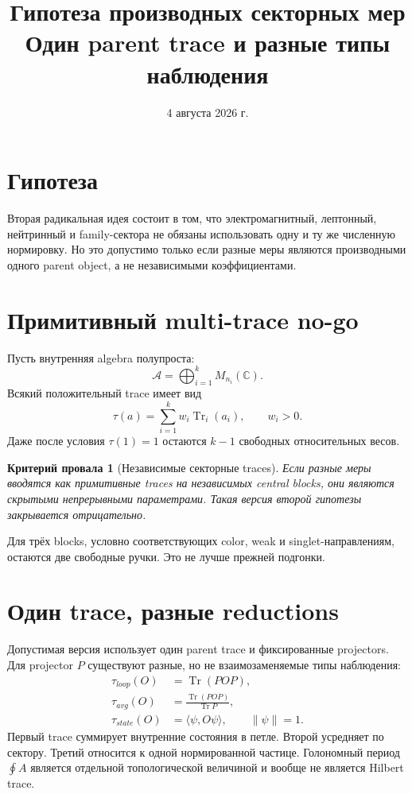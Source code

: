 \documentclass[12pt,a4paper]{article}
\title{Гипотеза производных секторных мер\\
Один parent trace и разные типы наблюдения}
\author{}
\date{4 августа 2026 г.}
\newtheorem{nogocriterion}{Критерий провала}
\begin{document}
\maketitle

\section{Гипотеза}

Вторая радикальная идея состоит в том, что электромагнитный, лептонный, нейтринный и family-сектора не обязаны использовать одну и ту же численную нормировку. Но это допустимо только если разные меры являются производными одного parent object, а не независимыми коэффициентами.

\section{Примитивный multi-trace no-go}

Пусть внутренняя algebra полупроста:
\[
\mathcal A=\bigoplus_{i=1}^k M_{n_i}(\mathbb C).
\]
Всякий положительный trace имеет вид
\[
\tau(a)=\sum_{i=1}^k w_i\operatorname{Tr}_i(a_i),
\qquad
w_i>0.
\]
Даже после условия \(\tau(1)=1\) остаются \(k-1\) свободных относительных весов.

\begin{nogocriterion}[Независимые секторные traces]
Если разные меры вводятся как примитивные traces на независимых central blocks, они являются скрытыми непрерывными параметрами. Такая версия второй гипотезы закрывается отрицательно.
\end{nogocriterion}

Для трёх blocks, условно соответствующих color, weak и singlet-направлениям, остаются две свободные ручки. Это не лучше прежней подгонки.

\section{Один trace, разные reductions}

Допустимая версия использует один parent trace и фиксированные projectors. Для projector \(P\) существуют разные, но не взаимозаменяемые типы наблюдения:
\begin{align}
\tau_{loop}(O)&=\operatorname{Tr}(POP),\\
\tau_{avg}(O)&=\frac{\operatorname{Tr}(POP)}{\operatorname{Tr}P},\\
\tau_{state}(O)&=\langle\psi,O\psi\rangle,
\qquad \|\psi\|=1.
\end{align}
Первый trace суммирует внутренние состояния в петле. Второй усредняет по сектору. Третий относится к одной нормированной частице. Голономный период \(\oint A\) является отдельной топологической величиной и вообще не является Hilbert trace.
\end{document}
